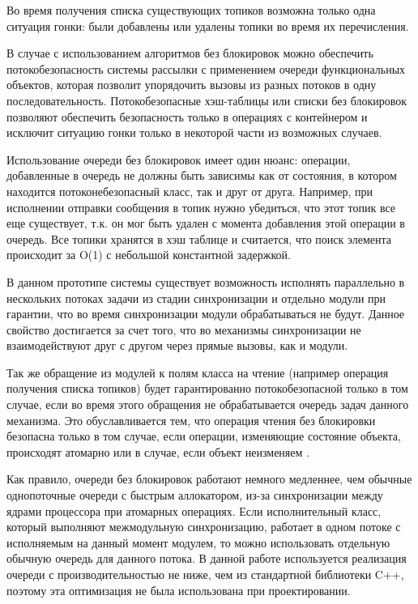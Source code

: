 Во время получения списка существующих топиков возможна только одна ситуация гонки: были добавлены или удалены топики во время их перечисления.

В случае с использованием алгоритмов без блокировок можно 
обеспечить потокобезопасность системы рассылки с применением 
очереди функциональных объектов, которая позволит упорядочить 
вызовы из разных потоков в одну последовательность. 
Потокобезопасные хэш-таблицы или списки без блокировок 
позволяют обеспечить безопасность только в операциях с 
контейнером и исключит ситуацию гонки только в некоторой части 
из возможных случаев. 

Использование очереди без блокировок имеет один нюанс: операции, 
добавленные в очередь не должны быть зависимы как от состояния, 
в котором находится потоконебезопасный класс, так и друг от 
друга. Например, при исполнении отправки сообщения в топик нужно 
убедиться, что этот топик все еще существует, т.к. он мог быть 
удален с момента добавления этой операции в очередь. Все 
топики хранятся в хэш таблице и считается, что поиск элемента 
происходит за O(1) с небольшой константной задержкой.

В данном прототипе системы существует возможность исполнять параллельно в нескольких потоках задачи из стадии синхронизации и отдельно модули при гарантии, что во время синхронизации модули обрабатываться не будут. Данное свойство достигается за счет того, что во механизмы синхронизации не взаимодействуют друг с другом через прямые вызовы, как и модули.

Так же обращение из модулей к полям класса на чтение (например 
операция получения списка топиков) будет гарантированно 
потокобезопасной только в том случае, если во время этого 
обращения не обрабатывается очередь задач данного механизма. Это 
обуславливается тем, что операция чтения без блокировки 
безопасна только в том случае, если операции, изменяющие 
состояние объекта, происходят атомарно  или в случае, если 
объект неизменяем \cite{williams2012c++}.

Как правило, очереди без блокировок работают немного медленнее, 
чем обычные однопоточные очереди с быстрым аллокатором, из-за 
синхронизации между ядрами процессора при атомарных операциях. 
Если исполнительный класс, который выполняют межмодульную 
синхронизацию, работает в одном потоке с исполняемым на данный 
момент модулем, то можно использовать отдельную обычную очередь 
для данного потока. В данной работе используется реализация 
очереди с производительностью не ниже, чем из стандартной 
библиотеки C++, поэтому эта оптимизация не была использована при 
проектировании.

